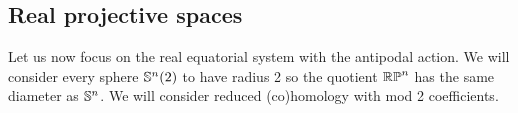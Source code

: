 
\subsection{Real projective spaces}\label{s:first_critical_value_rpn}

Let us now focus on the real equatorial system with the antipodal action.
We will consider every sphere \(\mathbb{S}^n(2)\) to have radius 2 so the quotient \(\mathbb{RP}^n\) has the same diameter as \(\mathbb{S}^n\).
We will consider reduced (co)homology with mod 2 coefficients.


%

%


%

